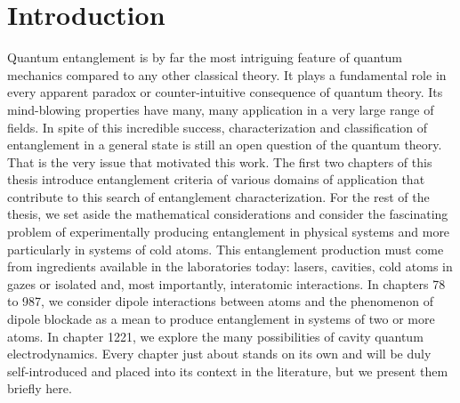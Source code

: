 \chapter*{Introduction}



Quantum entanglement is by far the most intriguing feature of quantum mechanics compared to any other classical theory. It plays a fundamental role in every apparent paradox or counter-intuitive consequence of quantum theory. Its mind-blowing properties have many, many application in a very large range of fields. In spite of this incredible success, characterization and classification of entanglement in a general state is still an open question of the quantum theory. That is the very issue that motivated this work. The first two chapters of this thesis introduce entanglement criteria of various domains of application that contribute to this search of entanglement characterization. For the rest of the thesis, we set aside the mathematical considerations and consider the fascinating problem of experimentally producing entanglement in physical systems and more particularly in systems of cold atoms.  This entanglement production must come from ingredients  available in the laboratories today: lasers, cavities, cold atoms in gazes or isolated and, most importantly, interatomic interactions. In chapters 78 to 987, we consider dipole interactions between atoms and the phenomenon of dipole blockade as a mean to produce entanglement in systems of two or more atoms. In chapter 1221, we explore the many possibilities of cavity quantum electrodynamics.  Every chapter just about stands on its own and will be duly self-introduced and placed into its context in the literature, but we present them briefly here.

